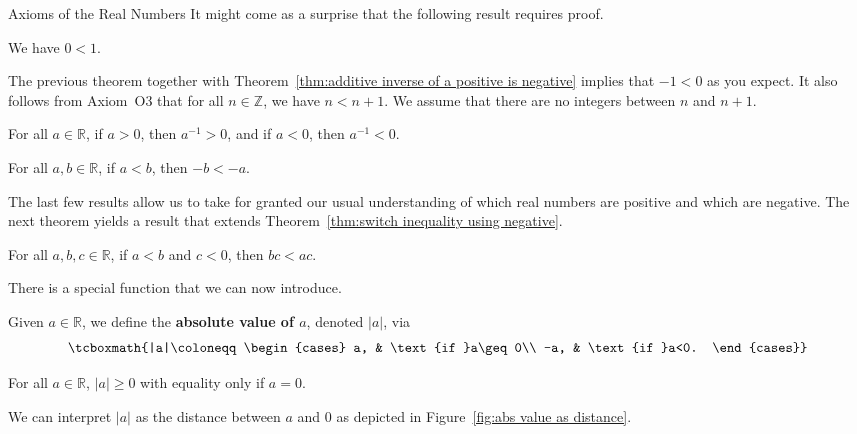 \begin{section}{Axioms of the Real Numbers}
It might come as a surprise that the following result requires proof.

\begin{theorem}\label{thm:0<1}
We have $0<1$.
\end{theorem}

The previous theorem together with Theorem~\ref{thm:additive inverse of a positive is negative} implies that $-1<0$ as you expect. It also follows from Axiom~O3 that for all $n\in\mathbb{Z}$, we have $n<n+1$. We assume that there are no integers between $n$ and $n+1$.

\begin{theorem}
For all $a\in\mathbb{R}$, if $a>0$, then $a^{-1}>0$, and if $a<0$, then $a^{-1}<0$.
\end{theorem}

\begin{theorem}\label{thm:switch inequality using negative}
For all $a,b\in \mathbb{R}$, if $a<b$, then $-b<-a$. 
\end{theorem}

The last few results allow us to take for granted our usual understanding of which real numbers are positive and which are negative. The next theorem yields a result that extends Theorem~\ref{thm:switch inequality using negative}.

\begin{theorem}
For all $a,b,c\in \mathbb{R}$, if $a<b$ and $c<0$, then $bc<ac$. 
\end{theorem}

There is a special function that we can now introduce. 

\begin{definition}
Given $a\in\mathbb{R}$, we define the \textbf{absolute value of $a$}, denoted $|a|$, via
\[
\tcboxmath{|a|\coloneqq \begin{cases}
a, & \text{if }a\geq 0\\
-a, & \text{if }a<0.
\end{cases}}
\]
\end{definition}

\begin{theorem}
For all $a\in\mathbb{R}$, $|a|\geq 0$ with equality only if $a=0$.
\end{theorem}

We can interpret $|a|$ as the distance between $a$ and 0 as depicted in Figure~\ref{fig:abs value as distance}. 


\end{section}
